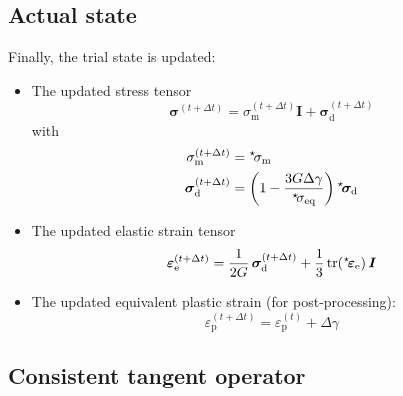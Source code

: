 \documentclass[times,namecite]{goose-article}
\newcommand\leftstar[1]{\hspace*{-.3em}~^\star\!#1}
\begin{document}
\subsection{Actual state}

Finally, the trial state is updated:
\begin{itemize}
%
\item The updated stress tensor
\begin{equation}
  \bm{\sigma}^{(t+\Delta t)}
  = \sigma_\mathrm{m}^{(t+\Delta t)} \bm{I} + \bm{\sigma}_\mathrm{d}^{(t+\Delta t)}
\end{equation}
with
\begin{align}
  \sigma_\mathrm{m}^{(t+\Delta t)}
  &=
  \leftstar{\sigma}_\mathrm{m}
  \\
  \bm{\sigma}_\mathrm{d}^{(t+\Delta t)}
  &=
  \left( 1 - \frac{3 G \Delta \gamma}{\leftstar{\sigma}_\mathrm{eq}} \right)
  \leftstar{\bm{\sigma}}_\mathrm{d}
\end{align}
%
\item The updated elastic strain tensor
\begin{equation}
  \bm{\varepsilon}_\mathrm{e}^{(t+\Delta t)}
  =
  \frac{1}{2G} \, \bm{\sigma}^{(t+\Delta t)}_\mathrm{d} +
  \frac{1}{3} \, \mathrm{tr} (\leftstar{\bm{\varepsilon}}_\mathrm{e}) \, \bm{I}
\end{equation}
%
\item The updated equivalent plastic strain (for post-processing):
\begin{equation}
  \varepsilon_\mathrm{p}^{(t+\Delta t)} = \varepsilon_\mathrm{p}^{(t)} + \Delta \gamma
\end{equation}
%
\end{itemize}

\subsection{Consistent tangent operator}
\end{document}
